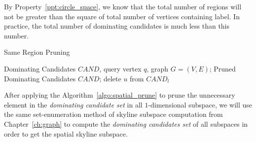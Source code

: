 By Property~\ref{ppt:circle_space}, we know that the total number of regions will not be greater than the square of total number of vertices containing label. In practice, the total number of dominating candidates is much less than this number.

\begin{algorithm}[H]
  \caption{Same Region Pruning}
  \label{algo:spatial_prune}
  \begin{algorithmic}[1]
  \show\LOOP
    \REQUIRE Dominating Candidates $CAND$, query vertex $q$, graph $G=(V, E)$;
    \ENSURE Pruned Dominating Candidates $CAND$;
                \STATE delete $u$ from $CAND_l$
            \ENDIF
        \ENDFOR
    \ENDFOR
  \end{algorithmic}
\end{algorithm}

After applying the Algorithm~\ref{algo:spatial_prune} to prune the unnecessary element in the \emph{dominating candidate set} in all $1$-dimensional subspace, we will use the same set-enumeration method of skyline subspace computation from Chapter~\ref{ch:graph} to compute the \emph{dominating candidates set} of all subspaces in order to get the spatial skyline subspace.










